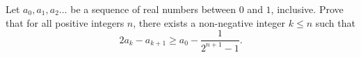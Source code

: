 Let $a_0,a_1,a_2\ldots$ be a sequence of real numbers between $0$ and $1$, inclusive. Prove that for all positive integers $n$, there exists a non-negative integer $k\leq n$ such that
\[
	2a_k-a_{k+1}\geq a_0-\frac{1}{2^{n+1}-1}.
\]